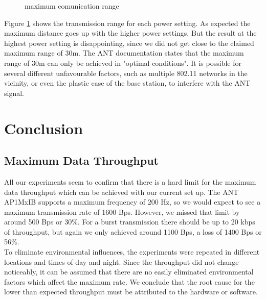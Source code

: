 \begin{description}
\begin{figure}[H]
		\caption{maximum comunication range}\label{fig:exp6}
	\end{figure}
	Figure \ref{fig:exp6} shows the transmission range for each power setting. As expected the maximum distance goes up with the higher power settings. But the result at the highest power setting is disappointing, since we did not get close to the claimed maximum range of 30m. The ANT documentation states that the maximum range of 30m can only be achieved in "optimal conditions"\cite{DynastreamInnovationsInc.2013}. It is possible for several different unfavourable factors, such as multiple 802.11 networks in the vicinity, or even the plastic case of the base station, to interfere with the ANT signal. 
\end{description}
\newpage


\chapter{Conclusion}

\section{Maximum Data Throughput}
\label{sec:dataThrougput}

All our experiments seem to confirm that there is a hard limit for the maximum data throughput which can be achieved with our current set up. The ANT AP1MxIB supports a maximum frequency of 200 Hz, so we would expect to see a maximum transmission rate of 1600 Bps. However, we missed that limit by around 500 Bps or 30\%. For a burst transmission there should be up to 20 kbps of throughput, but again we only achieved around 1100 Bps, a loss of 1400 Bps or 56\%.\\
To eliminate environmental influences, the experiments were repeated in different locations and times of day and night. Since the throughput did not change noticeably, it can be assumed that there are no easily eliminated environmental factors which affect the maximum rate. We conclude that the root cause for the lower than expected throughput must be attributed to the hardware or software. \\

